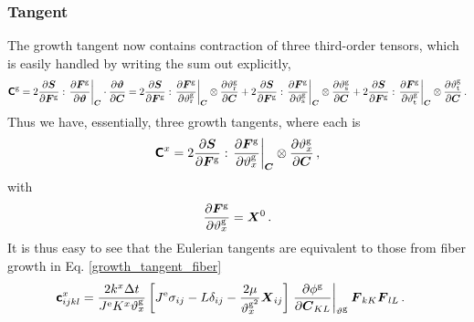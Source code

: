 \documentclass[10pt,letterpaper,oneside]{report}
\newcommand{\ten}[1]{\mbox{\boldmath $#1$}{}}
\newcommand{\tenf}[1]{\mbox{{\sffamily{\bfseries {#1}}}}}
\newcommand{\scas}[1]{\mbox{{\scriptsize{${\rm{#1}}$}}}{}}
\newcommand{\tens}[1]{\mbox{\boldmath{\scriptsize{$#1$}}}{}}
\begin{document}
\begin{itemize}
\subsubsection{Tangent}
The growth tangent now contains contraction of three third-order tensors, which is easily handled by writing the sum out explicitly, 
\begin{equation}
\tenf{C}^{\scas{g}} = 2 \frac{\partial \ten{S} }{\partial \ten{F}^{\scas{g}} } : \left. \frac{\partial \ten{F}^{\scas{g}} }{\partial \ten{\vartheta} } \right|_{\tens{C}} \cdot \frac{\partial \ten{\vartheta} }{\partial \ten{C}} 
= 2 \frac{\partial \ten{S} }{\partial \ten{F}^{\scas{g}} } : \left. \frac{\partial \ten{F}^{\scas{g}} }{\partial \vartheta_{\scas{r}}^{\scas{g}} } \right|_{\tens{C}} \otimes \frac{\partial  \vartheta_{\scas{r}}^{\scas{g}} }{\partial \ten{C}} 
+ 2 \frac{\partial \ten{S} }{\partial \ten{F}^{\scas{g}} } : \left. \frac{\partial \ten{F}^{\scas{g}} }{\partial \vartheta_{\scas{s}}^{\scas{g}} } \right|_{\tens{C}} \otimes \frac{\partial \vartheta_{\scas{s}}^{\scas{g}} }{\partial \ten{C}} 
+ 2 \frac{\partial \ten{S} }{\partial \ten{F}^{\scas{g}} } : \left. \frac{\partial \ten{F}^{\scas{g}} }{\partial \vartheta_{\scas{t}}^{\scas{g}} } \right|_{\tens{C}} \otimes \frac{\partial \vartheta_{\scas{t}}^{\scas{g}} }{\partial \ten{C}} \, . 
\end{equation}
Thus we have, essentially, three growth tangents, where each is
\begin{equation}
\tenf{C}^x = 2 \frac{\partial \ten{S} }{\partial \ten{F}^{\scas{g}} } : \left. \frac{\partial \ten{F}^{\scas{g}} }{\partial \vartheta_x^{\scas{g}} } \right|_{\tens{C}} \otimes \frac{\partial  \vartheta_x^{\scas{g}} }{\partial \ten{C}} \, ,
\end{equation}
with
\begin{equation}
\frac{\partial \ten{F}^{\scas{g}} }{\partial \vartheta_x^{\scas{g}} } = \ten{X}^0 \, . 
\end{equation}
It is thus easy to see that the Eulerian tangents are equivalent to those from fiber growth in Eq. \ref{growth_tangent_fiber}
\begin{align}
\tenf{c}^x_{ijkl} ={}& \frac{2 k^x \Delta t}{J^{\scas{e}} K^x \vartheta_x^{\scas{g}}} \left[ J^{\scas{e}} \sigma_{ij} - L \delta_{ij} - \frac{2 \mu }{\vartheta_x^{\scas{g}^2}} \ten{X}_{ij} \right] \left. \frac{\partial \phi^{\scas{g}} }{\partial \ten{C}_{KL}} \right|_{\vartheta^{\scas{g}}} \ten{F}_{kK} \ten{F}_{lL} \, . 
\end{align}



\end{itemize}
\end{document}

